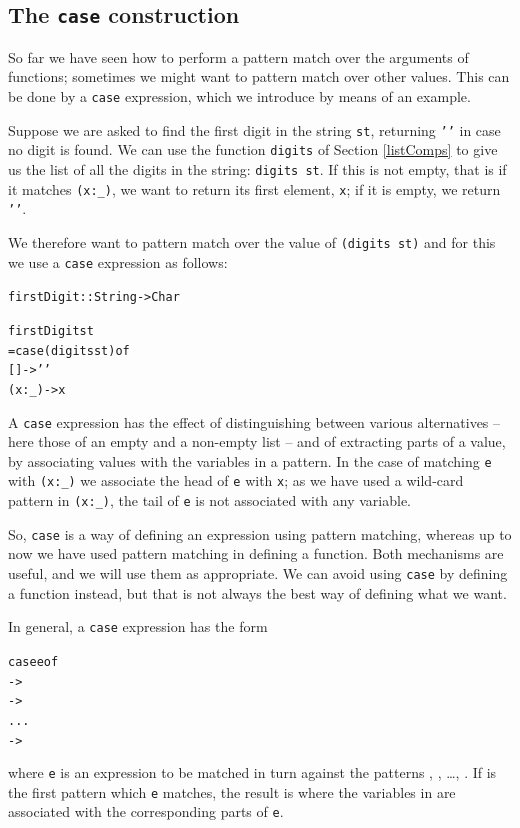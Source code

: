 \subsection*{The \texttt{case} construction}


So far we have seen how to perform a pattern match over the arguments of
functions; sometimes we might want to pattern match over other values. This
can be done by a \texttt{case} expression, which we introduce by means of an
example.

Suppose we are asked to find the first digit in the string \texttt{st},
returning 
\texttt{''} in case no digit is found. We can use the function \texttt{digits} of
Section \ref{listComps}
to give us the list of all the digits in the string:
\texttt{digits st}. If this is not empty, that is if it matches \texttt{(x:\_)},
we want to return
its first element, \texttt{x}; if it is empty, we return \texttt{''}. 

We therefore want to pattern match over the value of \texttt{(digits st)} and for
this we use a \texttt{case} expression as follows:
\begin{alltt}
firstDigit :: String -> Char

firstDigit st 
  = case (digits st) of
      []    -> ''
      (x:_) -> x
\end{alltt}
A \texttt{case} expression has the effect of distinguishing between various
alternatives -- here those of an empty and a non-empty list -- and of
extracting parts of a value, by associating values with the variables in a
pattern. 
In the case of matching \texttt{e} with \texttt{(x:\_)}
we associate the head of \texttt{e} with \texttt{x}; as we have used a wild-card
pattern in \texttt{(x:\_)}, the tail of \texttt{e} is not associated with any
variable.


So, \texttt{case} is a way of defining an expression using pattern matching, whereas up to now we have used pattern matching in defining a function. Both mechanisms are useful, and we will use them as appropriate. We can avoid using \texttt{case} by defining a function instead, but that is not always the best way of defining what we want.



In general, a \texttt{case} expression has the form\minx{->}
\begin{alltt}
case e of
  \pone -> \eone
  \ptwo -> \etwo
  ...
   -> 
\end{alltt}
where \texttt{e} is an expression to be matched in turn against the patterns
\pone, \ptwo, \ldots, .
If  is the first pattern which \texttt{e}
matches, the result is  where the variables in 
 are associated with the corresponding parts of \texttt{e}.

